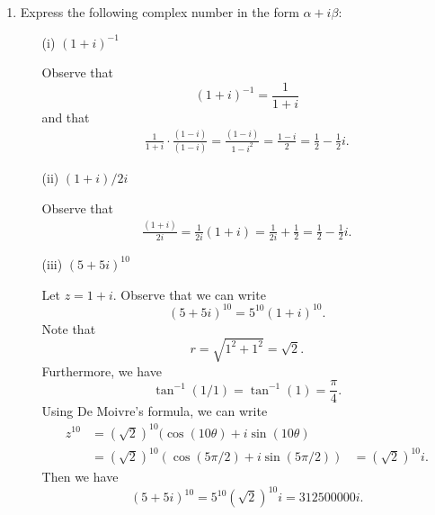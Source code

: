 \documentclass[a4paper]{article}
\begin{document}
\begin{enumerate}
\begin{proof}
        \end{proof}
    \item Express the following complex number in the form \( \alpha + i \beta  \):
        \begin{enumerate}
            \item[(i)] \( (1 + i)^{-1} \)
                \begin{solution}
                   Observe that  
                   \[  (1 + i)^{-1} = \frac{ 1 }{  1 + i }  \]
                   and that 
                   \begin{align*}
                      \frac{ 1 }{  1 + i  }  \cdot \frac{ (1 - i)  }{  (1- i) } = \frac{ (1- i) }{ 1 - i^{2} } = \frac{ 1 - i  }{ 2 } = \frac{ 1 }{ 2 }  - \frac{ 1 }{ 2 }  i.
                   \end{align*}
                \end{solution}
            \item[(ii)] \( (1 + i) / 2i \)
                \begin{solution}
                 Observe that    
                 \begin{align*}
                     \frac{ (1 + i) }{ 2i  }  = \frac{ 1 }{ 2i }  (1 + i) = \frac{ 1 }{ 2i }  + \frac{ 1 }{ 2 } = \frac{ 1 }{ 2 }  - \frac{ 1 }{ 2 }  i.  
                 \end{align*}
                \end{solution}
            \item[(iii)] \( (5 + 5i)^{10} \)
                \begin{solution}
                 Let \( z = 1 + i \). Observe that we can write   
                 \[  (5 + 5i)^{10} = 5^{10} (1 + i)^{10}. \]
                 Note that  
                 \[  r = \sqrt{ 1^{2} + 1^{2} }  = \sqrt{ 2 }. \]
                 Furthermore, we have
                 \[  \tan^{-1}(  1 / 1  ) = \tan^{-1}(1) = \frac{ \pi  }{ 4 }. \]
                 Using De Moivre's formula, we can write
                 \begin{align*}
                     z^{10} &= (\sqrt{ 2 })^{10}  (\cos(10 \theta ) + i \sin(10 \theta) \\
                           &=  (\sqrt{ 2 } )^{10} (\cos(5 \pi / 2 ) + i \sin( 5 \pi / 2))
                           &= (\sqrt{ 2 } )^{10} i.
                \end{align*}
                Then we have
                \[  (5 + 5i)^{10} = 5^{10} (\sqrt{ 2 } )^{10} i = 312500000 i. \]
            \end{solution}

\end{enumerate}
\end{enumerate}
\end{document}
